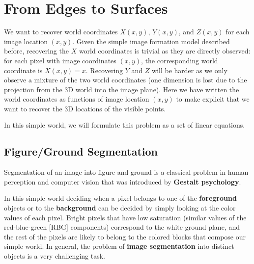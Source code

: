 \section{From Edges to Surfaces}

We want to recover world coordinates $X(x,y)$, $Y(x,y)$, and $Z(x,y)$ for each image location $(x,y)$. Given the simple image formation model described before, recovering the $X$ world coordinates is trivial as they are directly observed: for each pixel with image coordinates $(x,y)$, the corresponding world coordinate is $X(x,y) = x$. Recovering $Y$ and $Z$ will be harder as we only observe a mixture of the two world coordinates (one dimension is lost due to the projection from the 3D world into the image plane). Here we have written the world coordinates as functions of image location $(x,y)$ to make explicit that we want to recover the 3D locations of the visible points. 

In this simple world, we will formulate this problem as a set of linear equations. 



\subsection{Figure/Ground Segmentation}



Segmentation of an image into figure and ground is a classical problem in human perception and computer vision that was introduced by {\bf Gestalt psychology}.


In this simple world deciding when a pixel belongs to one of the {\bf foreground} objects or to the {\bf background} can be decided by simply looking at the color values of each pixel. Bright pixels that have low saturation (similar values of the red-blue-green [RBG] components) correspond to the white ground plane, and the rest of the pixels are likely to belong to the colored blocks that compose our simple world. In general, the problem of {\bf image segmentation} into distinct objects is a very challenging task.%


